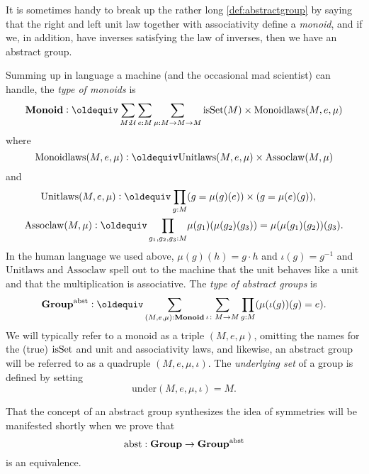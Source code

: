   \begin{remark}
    It is sometimes handy to break up the rather long \cref{def:abstractgroup}  by saying that the right and left unit law together with associativity define a \emph{monoid}, and if we, in addition, have inverses satisfying the law of inverses, then we have an abstract group.


      \label{rem:typemonoidabstrgp}
        Summing up in language a machine (and the occasional mad scientist) can handle, the \emph{type of monoids} is
$$\typemonoid\defequi \sum_{M:\UU}\sum_{e:M}\sum_{\mu{}:M\to M\to M}
\isset{(M)}\times\mathrm{Monoidlaws}(M,e,\mu)
$$
where
$$\mathrm{Monoidlaws}(M,e,\mu)\defequi\mathrm{Unitlaws}(M,e,\mu)\times\mathrm{Assoclaw}(M,\mu{})$$and
\begin{align*}
  \mathrm{Unitlaws}(M,e,\mu)\defequi\prod_{g:M}
&(g=\mu{}(g)(e))\times(g=\mu{}(e)(g)),\\
\mathrm{Assoclaw}(M,\mu{})\defequi\prod_{g_1,g_2,g_3:M}&\mu{}(g_1)(\mu{}(g_2)(g_3))=\mu{}(\mu{}(g_1)(g_2))(g_3).
\end{align*}
In the human language we used above, $\mu(g)(h)=g\cdot h$ and $\iota(g)=g^{-1}$ and $\mathrm{Unitlaws}$ and $\mathrm{Assoclaw}$ spell out to the machine that the unit behaves like a unit and that the multiplication is associative.
The
\emph{type of abstract groups} is
$$%
\typegroup^\abstr\defequi
\sum_{(M,e,\mu):\typemonoid}\sum_{\iota\colon M\to M}\prod_{g:M}(\mu{}(\iota{}(g))(g)=e).$$
We will typically refer to a monoid as a triple $(M,e,\mu)$, omitting the names for the (true) $\mathrm{isSet}$ and unit and associativity laws, and likewise, an abstract group will be referred to as a quadruple $(M,e,\mu,\iota)$.  The \emph{underlying set} of a group is defined by setting 
$$\mathrm{under}(M,e,\mu,\iota)=M.$$
\end{remark}
\begin{remark}
  That the concept of an abstract group synthesizes the idea of symmetries will be manifested shortly when we prove that 
$$\mathrm{abst}:\mathbf{Group}\to\mathbf{Group}^{\mathrm{abst}}$$
is an equivalence.
\end{remark}

